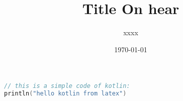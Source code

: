 \documentclass[12pt]{report}
\title{Title On hear}
\author{xxxx}
\date{\today}
\begin{document}
\maketitle
\tableofcontents %
\newpage

\begin{lstlisting}[caption={print something}, label={lst:kt}, language=Kotlin]
// this is a simple code of kotlin:
println("hello kotlin from latex")
\end{lstlisting}



\printbibliography
\newpage
\end{document}
